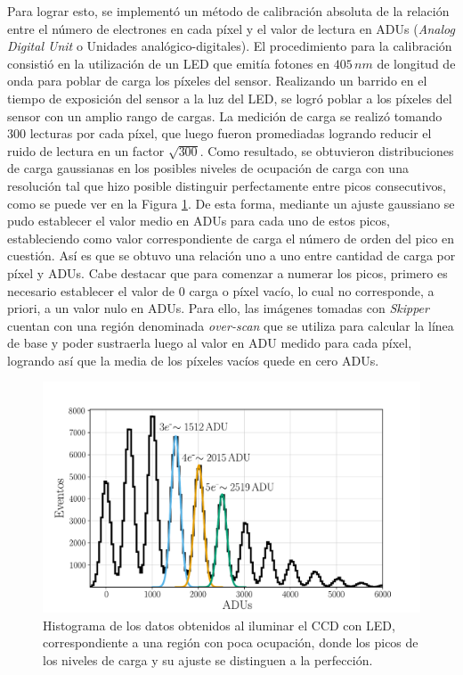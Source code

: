 Para lograr esto, se implementó un método de calibración absoluta de la relación entre el número de electrones en cada píxel y el valor de lectura en ADUs (\textit{Analog Digital Unit} o Unidades analógico-digitales). El procedimiento para la calibración consistió en la utilización de un LED que emitía fotones en $405\,\si{nm}$ de longitud de onda para poblar de carga los píxeles del sensor. Realizando un barrido en el tiempo de exposición del sensor a la luz del LED, se logró poblar a los píxeles del sensor con un amplio rango de cargas. La medición de carga se realizó tomando $300$ lecturas por cada píxel, que luego fueron promediadas logrando reducir el ruido de lectura en un factor $\sqrt{300}$. Como resultado, se obtuvieron distribuciones de carga gaussianas en los posibles niveles de ocupación de carga con una resolución tal que hizo posible distinguir perfectamente entre picos consecutivos, como se puede ver en la Figura \ref{fig:Calibracion}. De esta forma, mediante un ajuste gaussiano se pudo establecer el valor medio en ADUs para cada uno de estos picos, estableciendo como valor correspondiente de carga el número de orden del pico en cuestión. Así es que se obtuvo una relación uno a uno entre cantidad de carga por píxel y ADUs. Cabe destacar que para comenzar a numerar los picos, primero es necesario establecer el valor de $0$ carga o píxel vacío, lo cual no corresponde, a priori, a un valor nulo en ADUs. Para ello, las imágenes tomadas con \textit{Skipper} cuentan con una región denominada \textit{over-scan} que se utiliza para calcular la línea de base y poder sustraerla luego al valor en ADU medido para cada píxel, logrando así que la media de los píxeles vacíos quede en cero ADUs.
\begin{figure}[H]
    \centering
        \includegraphics[scale=0.5]{Figs/ajuste_gaussiano_calibracion.pdf}
    \caption{Histograma de los datos obtenidos al iluminar el CCD con LED, correspondiente a una región con poca ocupación, donde los picos de los niveles de carga y su ajuste se distinguen a la perfección.}
    \label{fig:Calibracion}
\end{figure}
